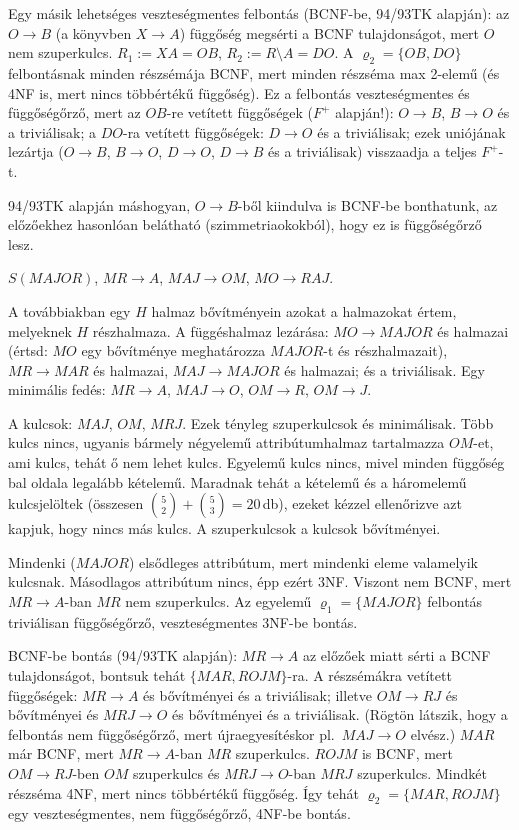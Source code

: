 \documentclass{article}
\begin{document}
Egy másik lehetséges veszteségmentes felbontás (BCNF-be, 94/93TK alapján):
az $O\to B$ (a könyvben $X\to A$)
függőség megsérti a BCNF tulajdonságot, mert $O$ nem szuperkulcs.
$R_1:=XA=OB$, $R_2:=R\setminus A=DO$. A $\varrho_2=\{OB,DO\}$ felbontásnak
minden részsémája BCNF, mert minden részséma max 2-elemű (és 4NF is, mert
nincs többértékű függőség).
Ez a felbontás veszteségmentes és függőségőrző, mert az $OB$-re vetített függőségek
($F^+$ alapján!): $O\to B$, $B\to O$ és a triviálisak; a $DO$-ra vetített függőségek:
$D\to O$ és a triviálisak; ezek uniójának lezártja ($O\to B$, $B\to O$,
$D\to O$, $D\to B$ és a triviálisak) visszaadja a teljes $F^+$-t.

94/93TK alapján máshogyan, $O\to B$-ből kiindulva is BCNF-be bonthatunk, az
előzőekhez hasonlóan belátható (szimmetriaokokból), hogy ez is
függőségőrző lesz.

$S(MAJOR)$, $MR\to A$, $MAJ\to OM$, $MO\to RAJ$.

\megoldas A továbbiakban egy $H$ halmaz bővítményein azokat a halmazokat
értem, melyeknek $H$ részhalmaza. A függéshalmaz lezárása: $MO\to MAJOR$ és
halmazai (értsd: $MO$ egy bővítménye meghatározza $MAJOR$-t és részhalmazait),
$MR\to MAR$ és halmazai, $MAJ\to MAJOR$ és halmazai; és a triviálisak. Egy
minimális fedés: $MR\to A$, $MAJ\to O$, $OM\to R$, $OM\to J$.

A kulcsok: $MAJ$, $OM$, $MRJ$. Ezek tényleg szuperkulcsok és minimálisak.
Több kulcs nincs, ugyanis bármely négyelemű attribútumhalmaz tartalmazza $OM$-et,
ami kulcs, tehát ő nem lehet kulcs. Egyelemű kulcs nincs, mivel minden függőség
bal oldala legalább kételemű. Maradnak tehát a kételemű és a háromelemű
kulcsjelöltek (összesen ${5\choose 2} + {5\choose 3} = 20\,$db), ezeket kézzel ellenőrizve azt kapjuk, hogy nincs más kulcs. A
szuperkulcsok a kulcsok bővítményei.

Mindenki ($MAJOR$) elsődleges attribútum, mert mindenki eleme valamelyik
kulcsnak. Másodlagos attribútum nincs, épp ezért 3NF. Viszont nem BCNF, mert
$MR\to A$-ban $MR$ nem szuperkulcs. Az egyelemű $\varrho_1=\{MAJOR\}$
felbontás triviálisan függőségőrző, veszteségmentes 3NF-be bontás.

BCNF-be bontás (94/93TK alapján): $MR\to A$ az előzőek miatt sérti a BCNF
tulajdonságot, bontsuk tehát $\{MAR,ROJM\}$-ra. A részsémákra vetített
függőségek: $MR\to A$ és bővítményei és a triviálisak; illetve $OM\to RJ$
és bővítményei és $MRJ\to O$ és bővítményei és a triviálisak. (Rögtön
látszik, hogy a felbontás nem függőségőrző, mert újraegyesítéskor
pl.\ $MAJ\to O$ elvész.) $MAR$ már BCNF, mert $MR\to A$-ban $MR$
szuperkulcs. $ROJM$ is BCNF, mert $OM\to RJ$-ben $OM$ szuperkulcs és $MRJ\to
O$-ban $MRJ$ szuperkulcs. Mindkét részséma 4NF, mert nincs többértékű
függőség. Így tehát $\varrho_2=\{MAR,ROJM\}$ egy
veszteségmentes, nem függőségőrző, 4NF-be bontás.
\end{document}
